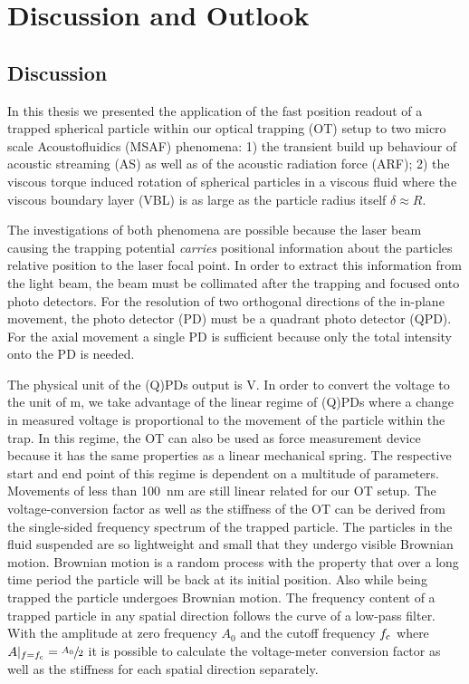 \chapter[Discussion \& Outlook]{Discussion and Outlook}\label{ch:discussion}

\section{Discussion}
In this thesis we presented the application of the fast position readout of a 
trapped spherical particle within our optical trapping (OT) setup to two micro 
scale Acoustofluidics (MSAF) phenomena: 1) the transient build up behaviour of 
acoustic streaming (AS) as well as of the acoustic radiation force (ARF); 2) 
the viscous torque induced rotation of spherical particles in a viscous fluid 
where the viscous boundary layer (VBL) is as large as the particle radius 
itself $\delta \approx R$.

The investigations of both phenomena are possible because the laser beam 
causing the trapping potential \emph{carries} positional information about the 
particles relative position to the laser focal point. In order to extract this 
information from the light beam, the beam must be collimated after the trapping 
and focused onto photo detectors. For the resolution of two orthogonal 
directions of the in-plane movement, the photo detector (PD) must be a quadrant 
photo detector (QPD). For the axial movement a single PD is sufficient because 
only the total intensity onto the PD is needed.

The physical unit of the (Q)PDs output is \si{\volt}. In order to convert the 
voltage to the unit of \si{\meter}, we take advantage of the linear regime of 
(Q)PDs where a change in measured voltage is proportional to the movement of 
the particle within the trap. In this regime, the OT can also be used as force 
measurement device because it has the same properties as a linear mechanical 
spring. The respective start and end point of this regime is dependent on a 
multitude of parameters. Movements of less than \SI{100}{\nm} are still linear 
related for our OT setup. The voltage-conversion factor as well as the 
stiffness of the OT can be derived from the single-sided frequency spectrum of 
the trapped particle. The particles in the fluid suspended are so lightweight 
and small that they undergo visible Brownian motion. Brownian motion is a 
random process with the property that over a long time period the particle will 
be back at its initial position. Also while being trapped the particle 
undergoes Brownian motion. The frequency content of a trapped particle in any 
spatial direction follows the curve of a low-pass filter. With the amplitude at 
zero frequency $A_{0}$ and the cutoff frequency $f_{\mathrm{c}}$ where 
$A\vert_{f=f_{\mathrm{c}}}=\sfrac{A_{0}}{2}$ it is possible to calculate the 
voltage-meter conversion factor as well as the stiffness for each spatial 
direction separately.


